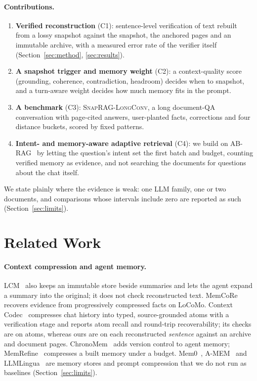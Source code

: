 \documentclass[10pt,twocolumn]{article}
\newcommand{\bench}{\textsc{SnapRAG-LongConv}}
\begin{document}
\paragraph{Contributions.}
\begin{enumerate}
\item \textbf{Verified reconstruction} (C1): sentence-level verification of text rebuilt from a lossy snapshot against the snapshot, the anchored pages and an immutable archive, with a measured error rate of the verifier itself (Section~\ref{sec:method}, \ref{sec:results}).
\item \textbf{A snapshot trigger and memory weight} (C2): a context-quality score (grounding, coherence, contradiction, headroom) decides when to snapshot, and a turn-aware weight decides how much memory fits in the prompt.
\item \textbf{A benchmark} (C3): \bench{}, a long document-QA conversation with page-cited answers, user-planted facts, corrections and four distance buckets, scored by fixed patterns.
\item \textbf{Intent- and memory-aware adaptive retrieval} (C4): we build on AB-RAG~\cite{kamthan2026abrag} by letting the question's intent set the first batch and budget, counting verified memory as evidence, and not searching the documents for questions about the chat itself.
\end{enumerate}
We state plainly where the evidence is weak: one LLM family, one or two documents, and comparisons whose intervals include zero are reported as such (Section~\ref{sec:limits}).

\section{Related Work}
\paragraph{Context compression and agent memory.}
LCM~\cite{lcm2026} also keeps an immutable store beside summaries and lets the agent expand a summary into the original; it does not check reconstructed text. MemCoRe~\cite{memcore2026} recovers evidence from progressively compressed facts on LoCoMo. Context Codec~\cite{trukhina2026codec} compresses chat history into typed, source-grounded atoms with a verification stage and reports atom recall and round-trip recoverability; its checks are on atoms, whereas ours are on each reconstructed \emph{sentence} against an archive and document pages. ChronoMem~\cite{su2026chronomem} adds version control to agent memory; MemRefine~\cite{memrefine2026} compresses a built memory under a budget. Mem0~\cite{chhikara2025mem0}, A-MEM~\cite{xu2025amem} and LLMLingua~\cite{jiang2023llmlingua} are memory stores and prompt compression that we do not run as baselines (Section~\ref{sec:limits}).
\end{document}
